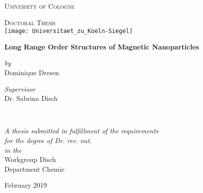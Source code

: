 \begin{titlepage}
\begin{center}
{\scshape\LARGE University of Cologne\par}
\vspace{1cm} %
\textsc{\Large Doctoral Thesis}\\[0.5cm] %
\vspace{.5cm}
\texttt{[image: Universitaet\_zu\_Koeln-Siegel]}

{\huge \bfseries Long Range Order Structures of Magnetic Nanoparticles\par}
\vspace{0.4cm} %

\begin{minipage}[t]{0.4\textwidth}
\begin{flushleft} \large
\centering
\textit{by}\\
Dominique Dresen
\end{flushleft}
\end{minipage}
\begin{minipage}[t]{0.4\textwidth}
\begin{flushright} \large
\centering
\textit{Supervisor}\\
Dr. Sabrina Disch %
\end{flushright}
\end{minipage}\\[3cm]

\vfill

\large \textit{A thesis submitted in fulfillment of the requirements\\ for the degree of Dr. rer. nat.}\\[0.3cm]
\textit{in the}\\[0.4cm]
Workgroup Disch\\Department Chemie\\[2cm]

\vfill

{\large February 2019}
\end{center}

\end{titlepage}